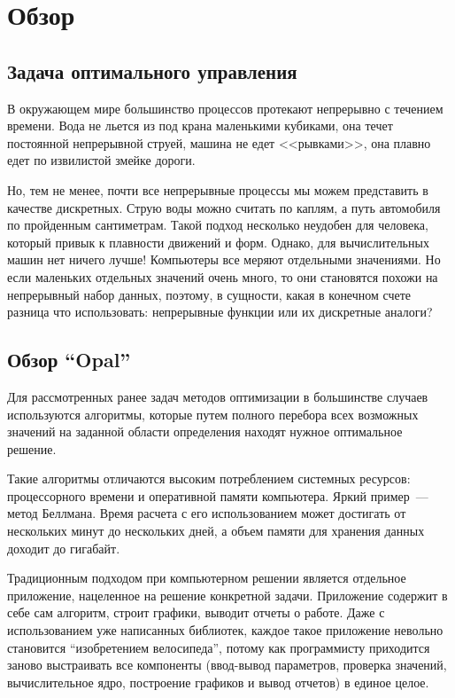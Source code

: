 \chapter{Обзор}

\section{Задача оптимального управления}

В окружающем мире большинство процессов протекают непрерывно с течением времени. Вода не льется из под крана маленькими кубиками, она течет постоянной непрерывной струей, машина не едет <<рывками>>, она плавно едет по извилистой змейке дороги.

Но, тем не менее, почти все непрерывные процессы мы можем представить в качестве дискретных. Струю воды можно считать по каплям, а путь автомобиля по пройденным сантиметрам. Такой подход несколько неудобен для человека, который привык к плавности движений и форм. Однако, для вычислительных машин нет ничего лучше! Компьютеры все меряют отдельными значениями. Но если маленьких отдельных значений очень много, то они становятся похожи на непрерывный набор данных, поэтому, в сущности, какая в конечном счете разница что использовать: непрерывные функции или их дискретные аналоги?

\section{Обзор “Opal”}

Для рассмотренных ранее задач методов оптимизации в большинстве случаев используются алгоритмы, которые путем полного перебора всех возможных значений на заданной области определения находят нужное оптимальное решение.

Такие алгоритмы отличаются высоким потреблением системных ресурсов: процессорного времени и оперативной памяти компьютера. Яркий пример~--- метод Беллмана. Время расчета с его использованием может достигать от нескольких минут до нескольких дней, а объем памяти для хранения данных доходит до гигабайт.

Традиционным подходом при компьютерном решении является отдельное приложение, нацеленное на решение конкретной задачи. Приложение содержит в себе сам алгоритм, строит графики, выводит отчеты о работе. Даже с использованием уже написанных библиотек, каждое такое приложение невольно становится “изобретением велосипеда”, потому как программисту приходится заново выстраивать все компоненты (ввод-вывод параметров, проверка значений, вычислительное ядро, построение графиков и вывод отчетов) в единое целое. 

